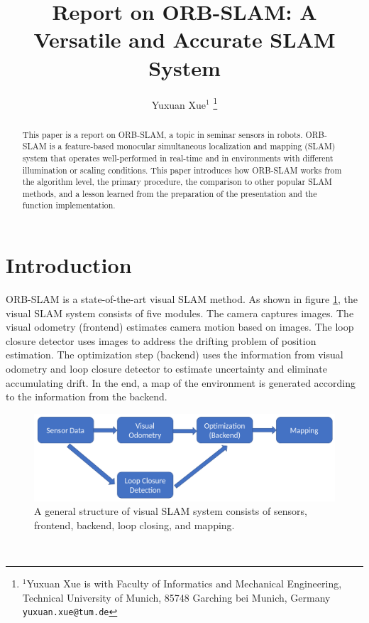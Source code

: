 \documentclass[letterpaper, 10 pt, conference]{ieeeconf}  %
\title{\LARGE \bf
Report on ORB-SLAM: A Versatile and Accurate SLAM System
}
\author{Yuxuan Xue$^{1}$%
\thanks{$^{1}$Yuxuan Xue is with Faculty of Informatics and Mechanical Engineering,
        Technical University of Munich, 85748 Garching bei Munich, Germany
        {\tt\small yuxuan.xue@tum.de}}%
}
\begin{document}
\maketitle
\thispagestyle{empty}
\pagestyle{empty}


\begin{abstract}

This paper is a report on ORB-SLAM, a topic in seminar sensors in robots. ORB-SLAM is a feature-based monocular simultaneous localization and mapping (SLAM) system that operates well-performed in real-time and in environments with different illumination or scaling conditions. This paper introduces how ORB-SLAM works from the algorithm level, the primary procedure, the comparison to other popular SLAM methods, and a lesson learned from the preparation of the presentation and the function implementation.


\end{abstract}


\section{Introduction}
\label{section_introduction}

ORB-SLAM \cite{ORBSLAM} is a state-of-the-art visual SLAM method. As shown in figure \ref{main_structure}, the visual SLAM system consists of five modules. The camera captures images. The visual odometry (frontend) estimates camera motion based on images. The loop closure detector uses images to address the drifting problem of position estimation. The optimization step (backend) uses the information from visual odometry and loop closure detector to estimate uncertainty and eliminate accumulating drift. In the end, a map of the environment is generated according to the information from the backend.
%
\begin{figure}[!htbp]%
\centering
\includegraphics[scale=0.175]{./images/Main_structure}
\caption{A general structure of visual SLAM system consists of sensors, frontend, backend, loop closing, and mapping.}
\label{main_structure}
\end{figure}
%
\\
\end{document}
